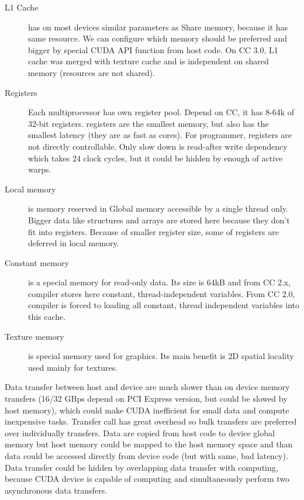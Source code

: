 \begin{description}
\item[L1 Cache] has on most devices similar parameters as Share memory, because it has same resource. We can configure which memory should be preferred and bigger by special CUDA API function from host code. On CC 3.0, L1 cache was merged with texture cache and is independent on shared memory (resources are not shared).
\item[Registers] Each multiprocessor has own register pool. Depend on CC, it has 8-64k of 32-bit registers. registers are the smallest memory, but also has the smallest latency (they are as fast as cores). For programmer, registers are not directly controllable. Only slow down is read-after write dependency which takes 24 clock cycles, but it could be hidden by enough of active warps.
\item[Local memory] is memory reserved in Global memory accessible by a single thread only. Bigger data like structures and arrays are stored here because they don't fit into registers. Because of smaller register size, some of registers are deferred in local memory.
\item[Constant memory] is a special memory for read-only data. Its size is 64kB and from CC 2.x, compiler stores here constant, thread-independent variables. From CC 2.0, compiler is forced to loading all constant, thread independent variables into this cache.
\item[Texture memory] is special memory used for graphics. Its main benefit is 2D spatial locality used mainly for textures.
\end{description}

Data transfer between host and device are much slower than on device memory transfers (16/32 GBps depend on PCI Express version, but could be slowed by host memory), which could make CUDA inefficient for small data and compute inexpensive tasks. Transfer call has great overhead so bulk transfers are preferred over individually transfers. Data are copied from host code to device global memory but host memory could be mapped to the host memory space and than data could be accessed directly from device code (but with same, bad latency). Data transfer could be hidden by overlapping data transfer with computing, because CUDA device is capable of computing and simultaneously perform two asynchronous data transfers.

